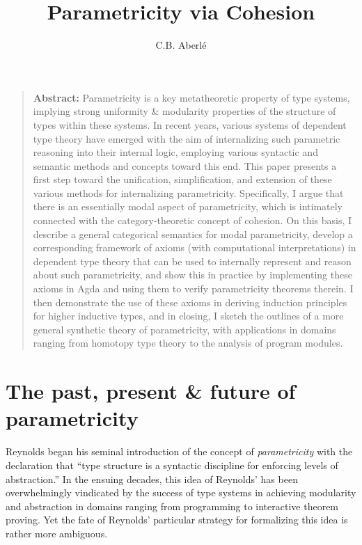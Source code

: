 \documentclass[
  12pt]{article}
\title{Parametricity via Cohesion}
\author{C.B. Aberlé}
\date{}
\begin{document}
\maketitle

\begin{quote}
\textbf{Abstract:} Parametricity is a key metatheoretic property of type
systems, implying strong uniformity \& modularity properties of the
structure of types within these systems. In recent years, various
systems of dependent type theory have emerged with the aim of
internalizing such parametric reasoning into their internal logic,
employing various syntactic and semantic methods and concepts toward
this end. This paper presents a first step toward the unification,
simplification, and extension of these various methods for internalizing
parametricity. Specifically, I argue that there is an essentially modal
aspect of parametricity, which is intimately connected with the
category-theoretic concept of cohesion. On this basis, I describe a
general categorical semantics for modal parametricity, develop a
corresponding framework of axioms (with computational interpretations)
in dependent type theory that can be used to internally represent and
reason about such parametricity, and show this in practice by
implementing these axioms in Agda and using them to verify parametricity
theorems therein. I then demonstrate the use of these axioms in deriving
induction principles for higher inductive types, and in closing, I
sketch the outlines of a more general synthetic theory of parametricity,
with applications in domains ranging from homotopy type theory to the
analysis of program modules.
\end{quote}

\section{The past, present \& future of
parametricity}\label{the-past-present-future-of-parametricity}

Reynolds began his seminal introduction of the concept of
\emph{parametricity} with the declaration that ``type structure is a
syntactic discipline for enforcing levels of abstraction.'' In the
ensuing decades, this idea of Reynolds' has been overwhelmingly
vindicated by the success of type systems in achieving modularity and
abstraction in domains ranging from programming to interactive theorem
proving. Yet the fate of Reynolds' particular strategy for formalizing
this idea is rather more ambiguous.
\end{document}
